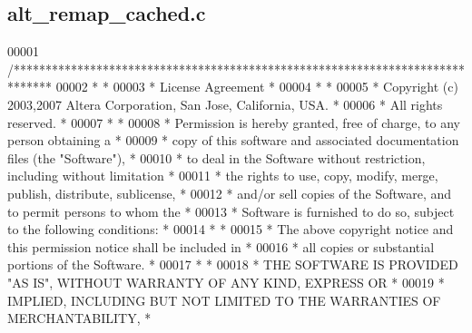 \subsection{alt\+\_\+remap\+\_\+cached.\+c}
\label{alt__remap__cached_8c_source}

\begin{DoxyCode}
00001 \textcolor{comment}{/******************************************************************************}
00002 \textcolor{comment}{*                                                                             *}
00003 \textcolor{comment}{* License Agreement                                                           *}
00004 \textcolor{comment}{*                                                                             *}
00005 \textcolor{comment}{* Copyright (c) 2003,2007 Altera Corporation, San Jose, California, USA.      *}
00006 \textcolor{comment}{* All rights reserved.                                                        *}
00007 \textcolor{comment}{*                                                                             *}
00008 \textcolor{comment}{* Permission is hereby granted, free of charge, to any person obtaining a     *}
00009 \textcolor{comment}{* copy of this software and associated documentation files (the "Software"),  *}
00010 \textcolor{comment}{* to deal in the Software without restriction, including without limitation   *}
00011 \textcolor{comment}{* the rights to use, copy, modify, merge, publish, distribute, sublicense,    *}
00012 \textcolor{comment}{* and/or sell copies of the Software, and to permit persons to whom the       *}
00013 \textcolor{comment}{* Software is furnished to do so, subject to the following conditions:        *}
00014 \textcolor{comment}{*                                                                             *}
00015 \textcolor{comment}{* The above copyright notice and this permission notice shall be included in  *}
00016 \textcolor{comment}{* all copies or substantial portions of the Software.                         *}
00017 \textcolor{comment}{*                                                                             *}
00018 \textcolor{comment}{* THE SOFTWARE IS PROVIDED "AS IS", WITHOUT WARRANTY OF ANY KIND, EXPRESS OR  *}
00019 \textcolor{comment}{* IMPLIED, INCLUDING BUT NOT LIMITED TO THE WARRANTIES OF MERCHANTABILITY,    *}

\end{DoxyCode}
